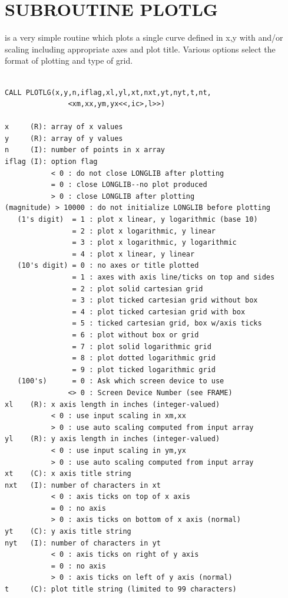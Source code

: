 \documentclass[11pt]{report}
\begin{document}
\newpage
\section{SUBROUTINE PLOTLG}

 is a very simple routine which
plots a single curve defined in x,y with  and/or 
scaling including appropriate axes and plot title. Various options
select the format of plotting and type of grid.
\begin{verbatim}

CALL PLOTLG(x,y,n,iflag,xl,yl,xt,nxt,yt,nyt,t,nt,
               <xm,xx,ym,yx<<,ic>,l>>)

x     (R): array of x values
y     (R): array of y values
n     (I): number of points in x array
iflag (I): option flag
           < 0 : do not close LONGLIB after plotting
           = 0 : close LONGLIB--no plot produced
           > 0 : close LONGLIB after plotting
(magnitude) > 10000 : do not initialize LONGLIB before plotting
   (1's digit)  = 1 : plot x linear, y logarithmic (base 10)
                = 2 : plot x logarithmic, y linear
                = 3 : plot x logarithmic, y logarithmic
                = 4 : plot x linear, y linear
   (10's digit) = 0 : no axes or title plotted
                = 1 : axes with axis line/ticks on top and sides
                = 2 : plot solid cartesian grid
                = 3 : plot ticked cartesian grid without box
                = 4 : plot ticked cartesian grid with box
                = 5 : ticked cartesian grid, box w/axis ticks
                = 6 : plot without box or grid
                = 7 : plot solid logarithmic grid
                = 8 : plot dotted logarithmic grid
                = 9 : plot ticked logarithmic grid
   (100's)      = 0 : Ask which screen device to use
               <> 0 : Screen Device Number (see FRAME)
xl    (R): x axis length in inches (integer-valued)
           < 0 : use input scaling in xm,xx
           > 0 : use auto scaling computed from input array
yl    (R): y axis length in inches (integer-valued)
           < 0 : use input scaling in ym,yx
           > 0 : use auto scaling computed from input array
xt    (C): x axis title string
nxt   (I): number of characters in xt
           < 0 : axis ticks on top of x axis
           = 0 : no axis
           > 0 : axis ticks on bottom of x axis (normal)
yt    (C): y axis title string
nyt   (I): number of characters in yt
           < 0 : axis ticks on right of y axis
           = 0 : no axis
           > 0 : axis ticks on left of y axis (normal)
t     (C): plot title string (limited to 99 characters)

\end{verbatim}
\end{document}
